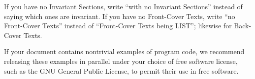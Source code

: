     

      If you have no Invariant
      Sections, write ``with no Invariant Sections''
      instead of saying which ones are invariant.  If you have no
      Front-Cover Texts, write
      ``no Front-Cover Texts'' instead of
      ``Front-Cover Texts being LIST''; likewise for Back-Cover Texts.
    

    
    

      If your document contains nontrivial examples of program code,
      we recommend releasing these examples in parallel under your
      choice of free software license, such as the  GNU General Public
      License, to permit their use in free software.
    

  

